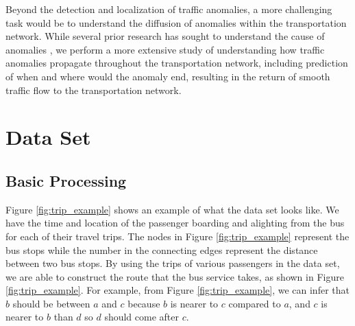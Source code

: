 \documentclass[10pt]{article}
\begin{document}
Beyond the detection and localization of traffic anomalies, a more challenging task would be to understand the diffusion of anomalies within the transportation network. While several prior research has sought to understand the cause of anomalies \cite{Chawla2012,Liu2011}, we perform a more extensive study of understanding how traffic anomalies propagate throughout the transportation network, including prediction of when and where would the anomaly end, resulting in the return of smooth traffic flow to the transportation network. %




\section{Data Set}

\subsection{Basic Processing}

Figure \ref{fig:trip_example} shows an example of what the data set looks like. We have the time and location of the passenger boarding and alighting from the bus for each of their travel trips. The nodes in Figure \ref{fig:trip_example} represent the bus stops while the number in the connecting edges represent the distance between two bus stops. By using the trips of various passengers in the data set, we are able to construct the route that the bus service takes, as shown in Figure \ref{fig:trip_example}. For example, from Figure \ref{fig:trip_example}, we can infer that $b$ should be between $a$ and $c$ because $b$ is nearer to $c$ compared to $a$, and $c$ is nearer to $b$ than $d$ so $d$ should come after $c$.
\end{document}

